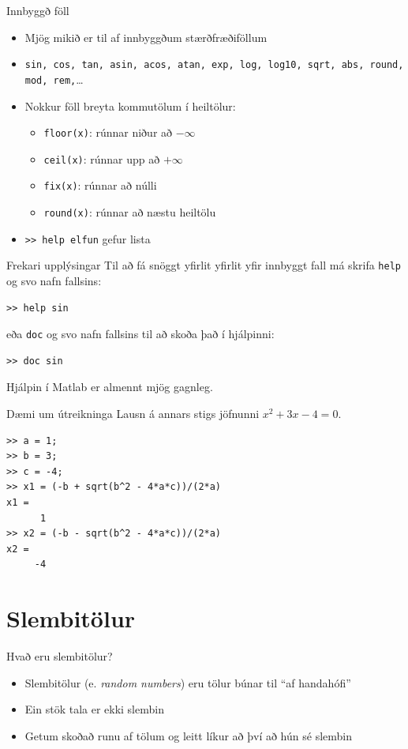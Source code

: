 \documentclass[handout]{beamer}
\begin{document}
\begin{frame}{Innbyggð föll}
\begin{itemize}
 \item Mjög mikið er til af innbyggðum stærðfræðiföllum
 \item \texttt{sin, cos, tan, asin, acos, atan, exp, log, log10, sqrt, abs, round, mod, rem,}\ldots
 \item Nokkur föll breyta kommutölum í heiltölur:
 \begin{itemize}
  \item \texttt{floor(x)}: rúnnar niður að $-\infty$
  \item \texttt{ceil(x)}: rúnnar upp að $+\infty$
  \item \texttt{fix(x)}: rúnnar að núlli
  \item \texttt{round(x)}: rúnnar að næstu heiltölu
 \end{itemize}
 \item \texttt{>> help elfun} gefur lista
\end{itemize}
\end{frame}

\begin{frame}[fragile]{Frekari upplýsingar}
Til að fá snöggt yfirlit yfirlit yfir innbyggt fall má skrifa \texttt{help} og svo nafn fallsins:
\begin{verbatim}
>> help sin
\end{verbatim}
eða \texttt{doc} og svo nafn fallsins til að skoða það í hjálpinni:
\begin{verbatim}
>> doc sin
\end{verbatim}
Hjálpin í Matlab er almennt mjög gagnleg.
\end{frame}

\begin{frame}{Dæmi um útreikninga}
\vspace{1.8cm}
Lausn á annars stigs jöfnunni $x^2 + 3x - 4 = 0$.
\begin{verbatim}
>> a = 1;
>> b = 3;
>> c = -4;
>> x1 = (-b + sqrt(b^2 - 4*a*c))/(2*a)
x1 =
      1
>> x2 = (-b - sqrt(b^2 - 4*a*c))/(2*a)
x2 =
     -4
\end{verbatim}
\end{frame}

\section{Slembitölur}

\begin{frame}{Hvað eru slembitölur?}
\begin{itemize}
 \item Slembitölur (e. \emph{random numbers}) eru tölur búnar til ``af handahófi''
 \item Ein stök tala er ekki slembin
 \item Getum skoðað runu af tölum og leitt líkur að því að hún sé slembin
\end{itemize}
\end{frame}
\end{document}

